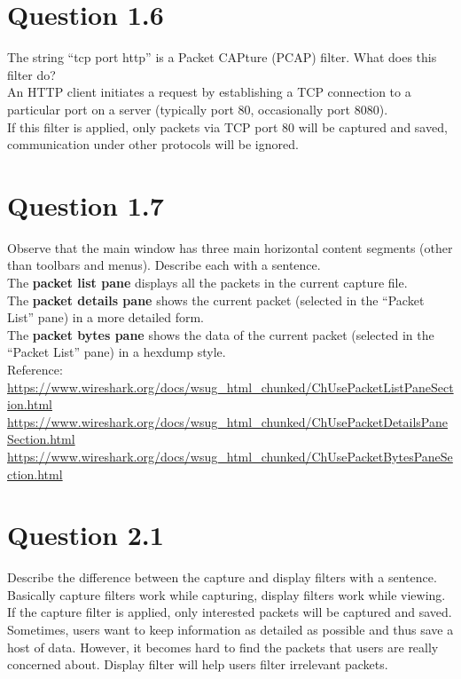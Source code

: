 \documentclass{article}
\newenvironment{homeworkProblem}[1]{
	\section*{#1}
	}{
}
\begin{document}
\begin{homeworkProblem}{Question 1.6}
The string ``tcp port http'' is a Packet CAPture (PCAP) filter. What does this filter do?\\

An HTTP client initiates a request by establishing a TCP connection to a particular port on a server (typically port 80, occasionally port 8080).\\

If this filter is applied, only packets via TCP port 80 will be captured and saved, communication under other protocols will be ignored.
\end{homeworkProblem}


\begin{homeworkProblem}{Question 1.7}
Observe that the main window has three main horizontal content segments (other than toolbars and menus). Describe each with a sentence.\\

The \textbf{packet list pane} displays all the packets in the current capture file.\\
The \textbf{packet details pane} shows the current packet (selected in the ``Packet List'' pane) in a more detailed form.\\
The \textbf{packet bytes pane} shows the data of the current packet (selected in the ``Packet List'' pane) in a hexdump style.\\

Reference:\\
\url{https://www.wireshark.org/docs/wsug_html_chunked/ChUsePacketListPaneSection.html}\\
\url{https://www.wireshark.org/docs/wsug_html_chunked/ChUsePacketDetailsPaneSection.html}\\
\url{https://www.wireshark.org/docs/wsug_html_chunked/ChUsePacketBytesPaneSection.html}
\end{homeworkProblem}


\begin{homeworkProblem}{Question 2.1}
Describe the difference between the capture and display filters with a sentence.\\

Basically capture filters work while capturing, display filters work while viewing.\\

If the capture filter is applied, only interested packets will be captured and saved. Sometimes, users want to keep information as detailed as possible and thus save a host of data. However, it becomes hard to find the packets that users are really concerned about. Display filter will help users filter irrelevant packets. 
\end{homeworkProblem}
\end{document}
